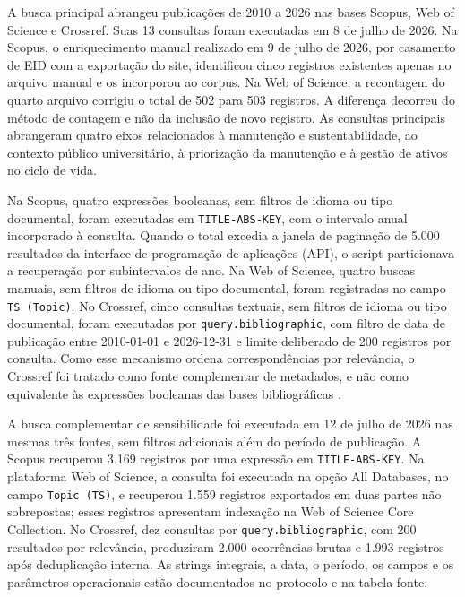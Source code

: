 A busca principal abrangeu publicações de 2010 a 2026 nas bases Scopus, Web of Science e Crossref. Suas 13 consultas foram executadas em 8 de julho de 2026. Na Scopus, o enriquecimento manual realizado em 9 de julho de 2026, por casamento de EID com a exportação do site, identificou cinco registros existentes apenas no arquivo manual e os incorporou ao corpus. Na Web of Science, a recontagem do quarto arquivo corrigiu o total de 502 para 503 registros. A diferença decorreu do método de contagem e não da inclusão de novo registro. As consultas principais abrangeram quatro eixos relacionados à manutenção e sustentabilidade, ao contexto público universitário, à priorização da manutenção e à gestão de ativos no ciclo de vida.

Na Scopus, quatro expressões booleanas, sem filtros de idioma ou tipo documental, foram executadas em \texttt{TITLE-ABS-KEY}, com o intervalo anual incorporado à consulta. Quando o total excedia a janela de paginação de 5.000 resultados da interface de programação de aplicações (API), o script particionava a recuperação por subintervalos de ano. Na Web of Science, quatro buscas manuais, sem filtros de idioma ou tipo documental, foram registradas no campo \texttt{TS (Topic)}. No Crossref, cinco consultas textuais, sem filtros de idioma ou tipo documental, foram executadas por \texttt{query.bibliographic}, com filtro de data de publicação entre 2010-01-01 e 2026-12-31 e limite deliberado de 200 registros por consulta. Como esse mecanismo ordena correspondências por relevância, o Crossref foi tratado como fonte complementar de metadados, e não como equivalente às expressões booleanas das bases bibliográficas \parencite{crossref_restapi_2026}.

A busca complementar de sensibilidade foi executada em 12 de julho de 2026 nas mesmas três fontes, sem filtros adicionais além do período de publicação. A Scopus recuperou 3.169 registros por uma expressão em \texttt{TITLE-ABS-KEY}. Na plataforma Web of Science, a consulta foi executada na opção All Databases, no campo \texttt{Topic (TS)}, e recuperou 1.559 registros exportados em duas partes não sobrepostas; esses registros apresentam indexação na Web of Science Core Collection. No Crossref, dez consultas por \texttt{query.bibliographic}, com 200 resultados por relevância, produziram 2.000 ocorrências brutas e 1.993 registros após deduplicação interna. As strings integrais, a data, o período, os campos e os parâmetros operacionais estão documentados no protocolo e na tabela-fonte.


